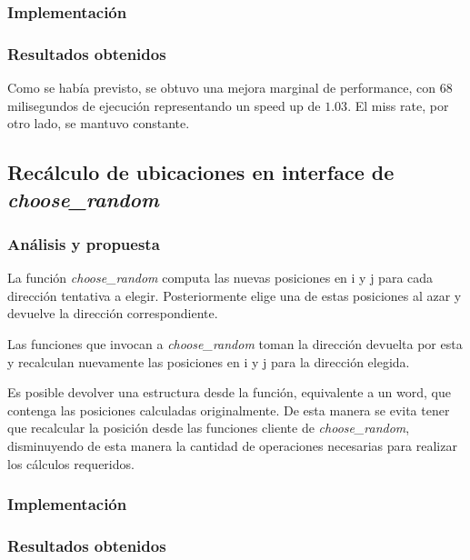 \documentclass[a4paper,11pt]{article}
\begin{document}
\subsubsection{Implementación}



\subsubsection{Resultados obtenidos}

Como se había previsto, se obtuvo una mejora marginal de performance, con 68
milisegundos de ejecución representando un speed up de \(1.03\). El miss rate,
por otro lado, se mantuvo constante.

\subsection{Recálculo de ubicaciones en interface de \textit{choose\_random}}

\subsubsection{Análisis y propuesta}

La función \textit{choose\_random} computa las nuevas posiciones en i y j para
cada dirección tentativa a elegir. Posteriormente elige una de estas posiciones
al azar y devuelve la dirección correspondiente.

Las funciones que invocan a \textit{choose\_random} toman la dirección devuelta
por esta y recalculan nuevamente las posiciones en i y j para la dirección
elegida.

Es posible devolver una estructura desde la función, equivalente a un word, que
contenga las posiciones calculadas originalmente. De esta manera se evita tener
que recalcular la posición desde las funciones cliente de
\textit{choose\_random}, disminuyendo de esta manera la cantidad de operaciones
necesarias para realizar los cálculos requeridos.

\subsubsection{Implementación}



\subsubsection{Resultados obtenidos}
\end{document}
